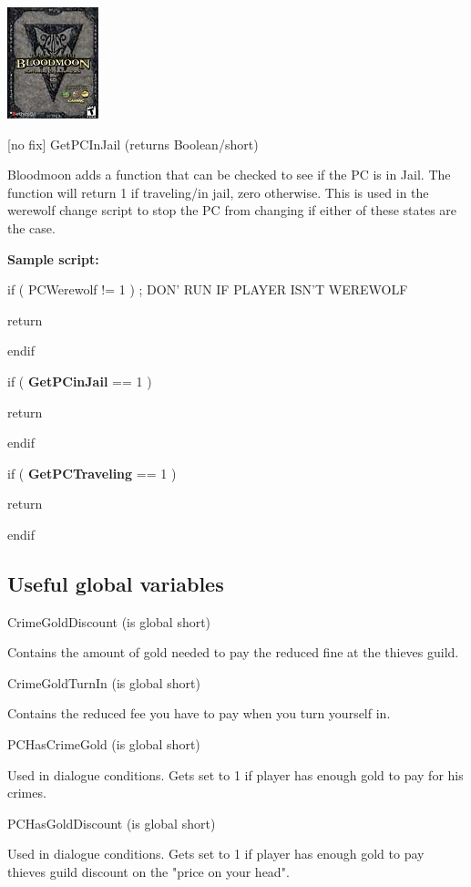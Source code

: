 \includegraphics{media/image7.png}

{[}no fix{]} GetPCInJail (returns Boolean/short)

Bloodmoon adds a function that can be checked to see if the PC is in
Jail. The function will return 1 if traveling/in jail, zero otherwise.
This is used in the werewolf change script to stop the PC from changing
if either of these states are the case.

\textbf{Sample script:}

if ( PCWerewolf != 1 ) ; DON' RUN IF PLAYER ISN'T WEREWOLF

return

endif

if ( \textbf{GetPCinJail} == 1 )

return

endif

if ( \textbf{GetPCTraveling} == 1 )

return

endif

\hypertarget{useful-global-variables}{%
\subsection{\texorpdfstring{\hfill\break
Useful global
variables}{ Useful global variables}}\label{useful-global-variables}}

CrimeGoldDiscount (is global short)

Contains the amount of gold needed to pay the reduced fine at the
thieves guild.

CrimeGoldTurnIn (is global short)

Contains the reduced fee you have to pay when you turn yourself in.

PCHasCrimeGold (is global short)

Used in dialogue conditions. Gets set to 1 if player has enough gold to
pay for his crimes.

PCHasGoldDiscount (is global short)

Used in dialogue conditions. Gets set to 1 if player has enough gold to
pay thieves guild discount on the "price on your head".

